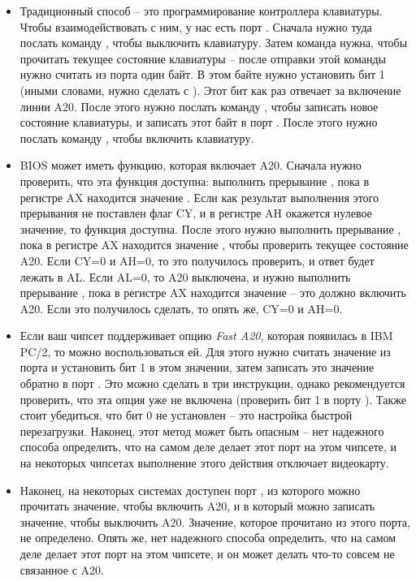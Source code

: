 \documentclass[a4page]{article}
\begin{document}
\begin{itemize}
    \item 
        Традиционный способ -- это программирование контроллера клавиатуры.
        Чтобы взаимодействовать с ним, у нас есть порт .
        Сначала нужно туда послать команду , чтобы выключить клавиатуру.
        Затем команда  нужна, чтобы прочитать текущее состояние клавиатуры --
        после отправки этой команды нужно считать из порта  один байт.
        В этом байте нужно установить бит 1 (иными словами, нужно сделать  с ).
        Этот бит как раз отвечает за включение линии A20.
        После этого нужно послать команду , чтобы записать новое состояние клавиатуры,
        и записать этот байт в порт .
        После этого нужно послать команду , чтобы включить клавиатуру.

    \item
        BIOS может иметь функцию, которая включает A20.
        Сначала нужно проверить, что эта функция доступна:
        выполнить прерывание , пока в регистре AX находится значение .
        Если как результат выполнения этого прерывания не поставлен флаг CY,
        и в регистре AH окажется нулевое значение,
        то функция доступна.
        После этого нужно выполнить прерывание , пока в регистре AX находится значение ,
        чтобы проверить текущее состояние A20.
        Если CY=0 и AH=0, то это получилось проверить, и ответ будет лежать в AL.
        Если AL=0, то A20 выключена, и нужно выполнить прерывание
        , пока в регистре AX находится значение  -- 
        это должно включить A20.
        Если это получилось сделать, то опять же, CY=0 и AH=0.

    \item
        Если ваш чипсет поддерживает опцию \emph{Fast A20}, которая появилась в IBM PC/2,
        то можно воспользоваться ей.
        Для этого нужно считать значение из порта  и установить бит 1 в этом значении,
        затем записать это значение обратно в порт .
        Это можно сделать в три инструкции,
        однако рекомендуется проверить, что эта опция уже не включена (проверить бит 1 в порту ).
        Также стоит убедиться, что бит 0 не установлен -- это настройка быстрой перезагрузки.
        Наконец, этот метод может быть опасным -- нет надежного способа определить, что на самом деле
        делает этот порт на этом чипсете, и на некоторых чипсетах выполнение этого действия отключает видеокарту.

    \item
        Наконец, на некоторых системах доступен порт , из которого можно прочитать значение, чтобы включить A20,
        и в который можно записать значение, чтобы выключить A20. Значение, которое прочитано из этого порта, не определено.
        Опять же, нет надежного способа определить, что на самом деле делает этот порт на этом чипсете,
        и он может делать что-то совсем не связанное с A20. 

\end{itemize}
\end{document}
